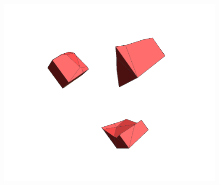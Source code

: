 \begin{figure}[htbp!]
{		\includegraphics[scale=0.125]{media/3-celeris/zoom/zoom3.png}
\label{fig:zoom3}}		
\hfill
\subfigure[]{%
}
\end{figure}
